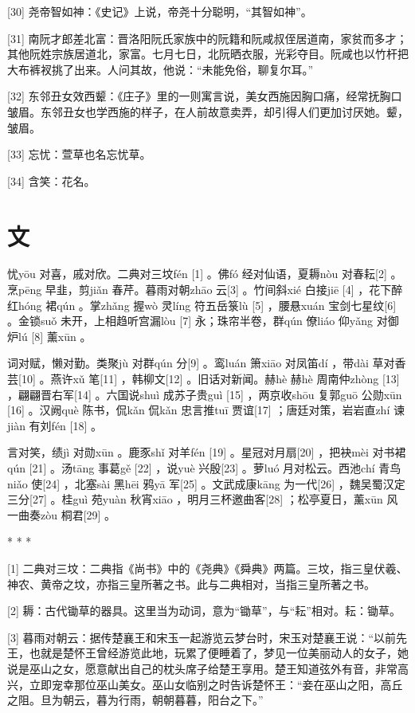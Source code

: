 \documentclass[12pt,UTF8]{ctexbook}
\begin{document}
[30] 尧帝智如神：《史记》上说，帝尧十分聪明，“其智如神”。

[31] 南阮才郎差北富：晋洛阳阮氏家族中的阮籍和阮咸叔侄居道南，家贫而多才；其他阮姓宗族居道北，家富。七月七日，北阮晒衣服，光彩夺目。阮咸也以竹杆把大布裤衩挑了出来。人问其故，他说：“未能免俗，聊复尔耳。”

[32] 东邻丑女效西颦：《庄子》里的一则寓言说，美女西施因胸口痛，经常抚胸口皱眉。东邻丑女也学西施的样子，在人前故意卖弄，却引得人们更加讨厌她。颦，皱眉。

[33] 忘忧：萱草也名忘忧草。

[34] 含笑：花名。





\chapter{文}


忧yōu 对喜，戚对欣。二典对三坟fén [1] 。佛fó 经对仙语，夏耨nòu 对春耘[2] 。烹pēng 早韭，剪jiǎn 春芹。暮雨对朝zhāo 云[3] 。竹间斜xié 白接jiē [4] ，花下醉红hóng 裙qún 。掌zhǎng 握wò 灵líng 符五岳箓lù [5] ，腰悬xuán 宝剑七星纹[6] 。金锁suǒ 未开，上相趋听宫漏lòu [7] 永；珠帘半卷，群qún 僚liáo 仰yǎng 对御炉lú [8] 薰xūn 。

词对赋，懒对勤。类聚jù 对群qún 分[9] 。鸾luán 箫xiāo 对凤笛dí ，带dài 草对香芸[10] 。燕许xǔ 笔[11] ，韩柳文[12] 。旧话对新闻。赫hè 赫hè 周南仲zhòng [13] ，翩翩晋右军[14] 。六国说shuì 成苏子贵guì [15] ，两京收shōu 复郭guō 公勋xūn [16] 。汉阙què 陈书，侃kǎn 侃kǎn 忠言推tuī 贾谊[17] ；唐廷对策，岩岩直zhí 谏jiàn 有刘fén [18] 。

言对笑，绩jì 对勋xūn 。鹿豕shǐ 对羊fén [19] 。星冠对月扇[20] ，把袂mèi 对书裙qún [21] 。汤tāng 事葛gě [22] ，说yuè 兴殷[23] 。萝luó 月对松云。西池chí 青鸟niǎo 使[24] ，北塞sài 黑hēi 鸦yā 军[25] 。文武成康kāng 为一代[26] ，魏吴蜀汉定三分[27] 。桂guì 苑yuàn 秋宵xiāo ，明月三杯邀曲客[28] ；松亭夏日，薰xūn 风一曲奏zòu 桐君[29] 。



* * *



[1] 二典对三坟：二典指《尚书》中的《尧典》《舜典》两篇。三坟，指三皇伏羲、神农、黄帝之坟，亦指三皇所著之书。此与二典相对，当指三皇所著之书。

[2] 耨：古代锄草的器具。这里当为动词，意为“锄草”，与“耘”相对。耘：锄草。

[3] 暮雨对朝云：据传楚襄王和宋玉一起游览云梦台时，宋玉对楚襄王说：“以前先王，也就是楚怀王曾经游览此地，玩累了便睡着了，梦见一位美丽动人的女子，她说是巫山之女，愿意献出自己的枕头席子给楚王享用。楚王知道弦外有音，非常高兴，立即宠幸那位巫山美女。巫山女临别之时告诉楚怀王：“妾在巫山之阳，高丘之阻。旦为朝云，暮为行雨，朝朝暮暮，阳台之下。”
\end{document}
